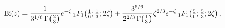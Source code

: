 \[\mathop{\mathrm{Bi}\/}\nolimits\!\left(z\right)=\frac{1}{3^{1/6}\mathop{\Gamma%
\/}\nolimits\!\left(\tfrac{2}{3}\right)}e^{-\zeta}\mathop{{{}_{1}F_{1}}\/}%
\nolimits\!\left(\tfrac{1}{6};\tfrac{1}{3};2\zeta\right)+\frac{3^{5/6}}{2^{2/3%
}\mathop{\Gamma\/}\nolimits\!\left(\tfrac{1}{3}\right)}\zeta^{2/3}e^{-\zeta}%
\mathop{{{}_{1}F_{1}}\/}\nolimits\!\left(\tfrac{5}{6};\tfrac{5}{3};2\zeta%
\right),\]